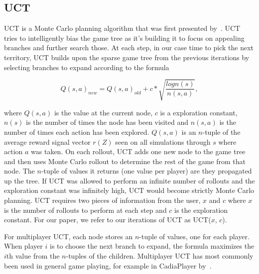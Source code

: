 \documentclass[letterpaper]{article}
\numberwithin{equation}{section}
\numberwithin{theorem}{section}
\numberwithin{lemma}{section}
\numberwithin{df}{section}
\begin{document}
\subsection{UCT}

UCT is a Monte Carlo planning algorithm that was first presented by~\cite{UCT}. UCT tries to intelligently bias the game tree as it's building it to focus on appealing branches and further search those. At each step, in our case time to pick the next territory, UCT builds upon the sparse game tree from the previous iterations by selecting branches to expand according to the formula

\[ Q(s,a)_{new} = Q(s,a)_{old} + c* \sqrt{\frac{log n(s)}{n(s,a)}}, \]

where $Q(s,a)$ is the value at the current node, $c$ is a exploration  constant, $n(s)$ is the number of times the node has been visited and  $n(s,a)$ is the number of times each action has been explored. $Q(s,a) $ is an $n$-tuple of the average reward signal vector $r(Z)$ seen on  all simulations through $s$ where action $a$ was taken.  On each  rollout, UCT adds one new node to the game tree and then uses Monte  Carlo rollout to determine the rest of the game from that node. The $n $-tuple of values it returns (one value per player) are they  propagated up the tree.  If UCT was allowed to perform an infinite  number of rollouts and the exploration constant was infinitely high,  UCT would become strictly Monte Carlo planning. UCT requires two  pieces of information from the user, $x$ and $c$ where $x$ is the  number of rollouts to perform at each step and $c$ is the exploration  constant. For our paper, we refer to our iterations of UCT as UCT($x$,  $c$).

For multiplayer UCT, each node stores an $n$-tuple of values, one for each player. When player $i$ is to choose the next branch to expand, the formula maximizes the $i$th value from the $n$-tuples of the children. Multiplayer UCT has most commonly been used in general game playing, for example in CadiaPlayer by~\cite{Cadia}. 




\end{document}
